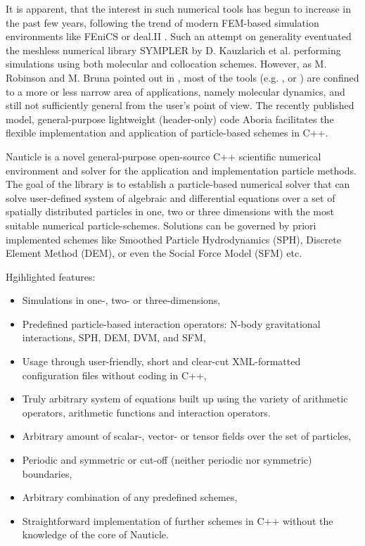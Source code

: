 \documentclass[a4paper,12pt,openany]{book}
\theoremstyle{break}
\begin{document}
It is apparent, that the interest in such numerical tools has begun to increase in the past few years, following the trend of modern FEM-based simulation environments like FEniCS \cite{Fenics} or deal.II \cite{deal2}. Such an attempt on generality eventuated the meshless numerical library SYMPLER by D. Kauzlarich et al. \cite{SYMPLER} performing simulations using both molecular and collocation schemes. However, as M. Robinson and M. Bruna pointed out in \cite{Aboria}, most of the tools (e.g. \cite{LAMMPS}, \cite{ESPResSo} or \cite{GROMACS}) are confined to a more or less narrow area of applications, namely molecular dynamics, and still not sufficiently general from the user's point of view. The recently published model, general-purpose lightweight (header-only) code Aboria \cite{Aboria} facilitates the flexible implementation and application of particle-based schemes in C++. 

Nauticle is a novel general-purpose open-source C++ scientific numerical environment and solver for the application and implementation particle methods. The goal of the library is to establish a particle-based numerical solver that can solve user-defined system of algebraic and differential equations over a set of spatially distributed particles in one, two or three dimensions with the most suitable numerical particle-schemes. Solutions can be governed by priori implemented schemes like Smoothed Particle Hydrodynamics (SPH), Discrete Element Method (DEM), or even the Social Force Model (SFM) etc.

Hgihlighted features:
\begin{itemize}
  \item Simulations in one-, two- or three-dimensions,
  \item Predefined particle-based interaction operators: N-body gravitational interactions, SPH, DEM, DVM, and SFM,
  \item Usage through user-friendly, short and clear-cut XML-formatted configuration files without coding in C++,
  \item Truly arbitrary system of equations built up using the variety of arithmetic operators, arithmetic functions and interaction operators.
  \item Arbitrary amount of scalar-, vector- or tensor fields over the set of particles,
  \item Periodic and symmetric or cut-off (neither periodic nor symmetric) boundaries,
  \item Arbitrary combination of any predefined schemes,
  \item Straightforward implementation of further schemes in C++ without the knowledge of the core of Nauticle.
\end{itemize}
\end{document}
